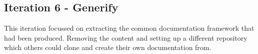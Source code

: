 \subsection{Iteration 6 - Generify}
This iteration focussed on extracting the common documentation framework that
had been produced. Removing the content and setting up a different repository
which others could clone and create their own documentation from.



%
%
